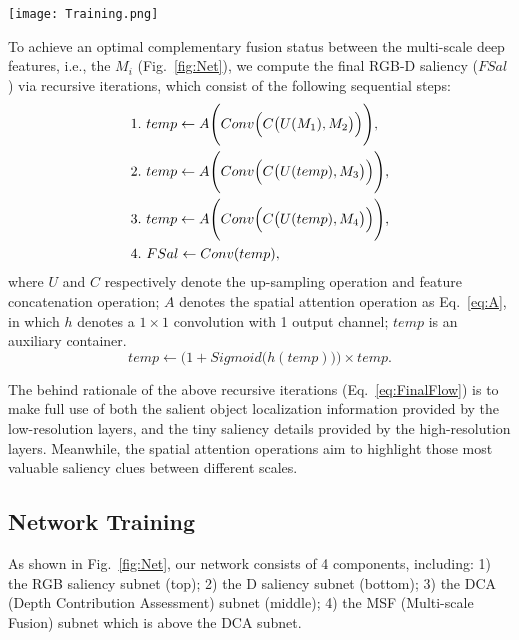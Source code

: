 \documentclass[journal]{IEEEtran}
\begin{document}
\begin{figure*}
\begin{center}
\texttt{[image: Training.png]}
\end{center}
   \caption{The demonstrations of our stage-wise training scheme (Sec.~\ref{sec:NT}).}
\label{fig:Training}
\end{figure*}

To achieve an optimal complementary fusion status between the multi-scale deep features, i.e., the $M_i$ (Fig.~\ref{fig:Net}), we compute the final RGB-D saliency ($FSal$) via recursive iterations, which consist of the following sequential steps:
\begin{equation}
\begin{split}
{\rm 1.}&\ temp \gets A\Bigg(Conv\Big(C\big(U(M_1),M_2\big)\Big)\Bigg),\\
{\rm 2.}&\ temp \gets A\Bigg(Conv\Big(C\big(U(temp),M_3\big)\Big)\Bigg),\\
{\rm 3.}&\ temp \gets A\Bigg(Conv\Big(C\big(U(temp),M_4\big)\Big)\Bigg),\\
{\rm 4.}&\ FSal \gets Conv(temp),
\label{eq:FinalFlow}
\end{split}
\end{equation}
where $U$ and $C$ respectively denote the up-sampling operation and feature concatenation operation; $A$ denotes the spatial attention operation as Eq.~\ref{eq:A}, in which $h$ denotes a $1\times 1$ convolution with 1 output channel; $temp$ is an auxiliary container.
\begin{equation}
temp \gets \Big(1+Sigmoid\big(h(temp)\big)\Big)\times temp.
\label{eq:A}
\end{equation}

The behind rationale of the above recursive iterations (Eq.~\ref{eq:FinalFlow}) is to make full use of both the salient object localization information provided by the low-resolution layers, and the tiny saliency details provided by the high-resolution layers.
Meanwhile, the spatial attention operations aim to highlight those most valuable saliency clues between different scales.

\subsection{Network Training}
\label{sec:NT}
As shown in Fig.~\ref{fig:Net}, our network consists of 4 components, including: 1) the RGB saliency subnet (top); 2) the D saliency subnet (bottom); 3) the DCA (Depth Contribution Assessment) subnet (middle); 4) the MSF (Multi-scale Fusion) subnet which is above the DCA subnet.
\end{document}
